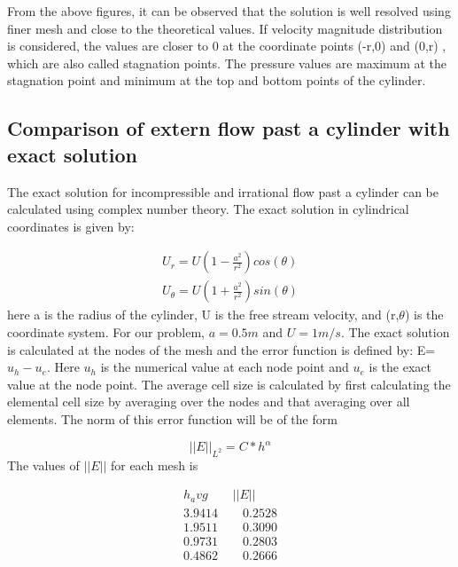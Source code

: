 \documentclass[12pt]{elsarticle}
\begin{document}
	From the above figures, it can be observed that the solution is well resolved using finer mesh and close to the theoretical values. If velocity magnitude distribution is considered, the values are closer to 0 at the coordinate points (-r,0) and (0,r) , which are also called stagnation points. The pressure values are maximum at the stagnation point and minimum at the top and bottom points of the cylinder.
	
	\subsection{Comparison of extern flow past a cylinder with exact solution}
	The exact solution for incompressible and irrational flow past a cylinder can be calculated using complex number theory. The exact solution in cylindrical coordinates is given by:
	
	\begin{equation}
		\begin{gathered}
			U_r=U(1-\frac{a^2}{r^2})cos(\theta) \\
			U_{\theta}=U(1+\frac{a^2}{r^2}) sin(\theta)
		\end{gathered}
	\end{equation}
	here a is the radius of the cylinder, U is the free stream velocity, and (r,$\theta$) is the coordinate system. For our problem, $a=0.5 m$ and $U=1 m/s$. The exact solution is calculated at the nodes of the mesh and the error function is defined by: E=$u_h-u_e$. Here $u_h$ is the numerical value at each node point and $u_e$ is the exact value at the node point. The average cell size is calculated by first calculating the elemental cell size by averaging over the nodes and that averaging over all elements. The norm of this error function will be of the form
	
	\begin{equation}
		||E||_{L^2}=C*h^{\alpha}
	\end{equation}
	The values of $||E||$ for each mesh is
	
	\begin{equation}
		\begin{gathered}
			h_avg \quad \quad ||E|| \\
			3.9414 \quad \quad 0.2528 \\
			1.9511 \quad \quad 0.3090 \\
			0.9731 \quad \quad 0.2803 \\
			0.4862 \quad \quad 0.2666 \\
		\end{gathered}
	\end{equation}
	
\end{document}
